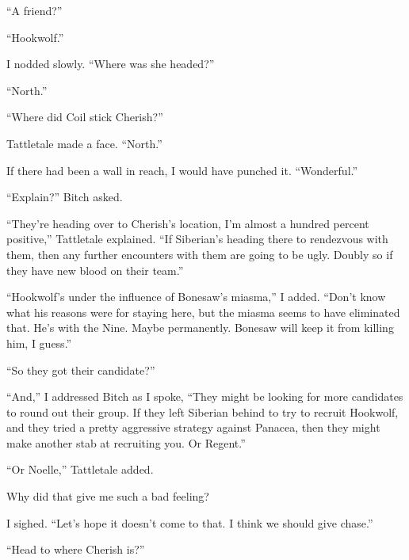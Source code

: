 ``A friend?''



``Hookwolf.''



I nodded slowly.  ``Where was she headed?''



``North.''



``Where did Coil stick Cherish?''



Tattletale made a face.  ``North.''



If there had been a wall in reach, I would have punched it.  ``Wonderful.''



``Explain?'' Bitch asked.



``They're heading over to Cherish's location, I'm almost a hundred percent positive,'' Tattletale explained.  ``If Siberian's heading there to rendezvous with them, then any further encounters with them are going to be ugly.  Doubly so if they have new blood on their team.''



``Hookwolf's under the influence of Bonesaw's miasma,'' I added.  ``Don't know what his reasons were for staying here, but the miasma seems to have eliminated that.  He's with the Nine.  Maybe permanently.  Bonesaw will keep it from killing him, I guess.''



``So they got their candidate?''



``And,'' I addressed Bitch as I spoke, ``They might be looking for more candidates to round out their group.  If they left Siberian behind to try to recruit Hookwolf, and they tried a pretty aggressive strategy against Panacea, then they might make another stab at recruiting you.  Or Regent.''



``Or Noelle,'' Tattletale added.



Why did that give me such a bad feeling?



I sighed.  ``Let's hope it doesn't come to that.  I think we should give chase.''



``Head to where Cherish is?''



